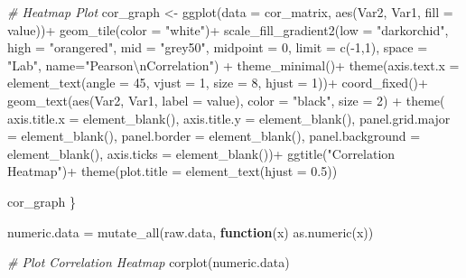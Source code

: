 \documentclass[
]{article}
\newenvironment{Shaded}{\begin{snugshade}}{\end{snugshade}}
\newcommand{\AttributeTok}[1]{\textcolor[rgb]{0.77,0.63,0.00}{#1}}
\newcommand{\CommentTok}[1]{\textcolor[rgb]{0.56,0.35,0.01}{\textit{#1}}}
\newcommand{\ControlFlowTok}[1]{\textcolor[rgb]{0.13,0.29,0.53}{\textbf{#1}}}
\newcommand{\DecValTok}[1]{\textcolor[rgb]{0.00,0.00,0.81}{#1}}
\newcommand{\FloatTok}[1]{\textcolor[rgb]{0.00,0.00,0.81}{#1}}
\newcommand{\FunctionTok}[1]{\textcolor[rgb]{0.00,0.00,0.00}{#1}}
\newcommand{\NormalTok}[1]{#1}
\newcommand{\OtherTok}[1]{\textcolor[rgb]{0.56,0.35,0.01}{#1}}
\newcommand{\SpecialCharTok}[1]{\textcolor[rgb]{0.00,0.00,0.00}{#1}}
\newcommand{\StringTok}[1]{\textcolor[rgb]{0.31,0.60,0.02}{#1}}
\begin{document}
\begin{Shaded}
\begin{Highlighting}[]
  \CommentTok{\# Heatmap Plot}
\NormalTok{  cor\_graph }\OtherTok{\textless{}{-}} \FunctionTok{ggplot}\NormalTok{(}\AttributeTok{data =}\NormalTok{ cor\_matrix, }\FunctionTok{aes}\NormalTok{(Var2, Var1, }\AttributeTok{fill =}\NormalTok{ value))}\SpecialCharTok{+}
    \FunctionTok{geom\_tile}\NormalTok{(}\AttributeTok{color =} \StringTok{"white"}\NormalTok{)}\SpecialCharTok{+}
    \FunctionTok{scale\_fill\_gradient2}\NormalTok{(}\AttributeTok{low =} \StringTok{"darkorchid"}\NormalTok{, }\AttributeTok{high =} \StringTok{"orangered"}\NormalTok{, }\AttributeTok{mid =} \StringTok{"grey50"}\NormalTok{, }
                         \AttributeTok{midpoint =} \DecValTok{0}\NormalTok{, }\AttributeTok{limit =} \FunctionTok{c}\NormalTok{(}\SpecialCharTok{{-}}\DecValTok{1}\NormalTok{,}\DecValTok{1}\NormalTok{), }\AttributeTok{space =} \StringTok{"Lab"}\NormalTok{, }
                         \AttributeTok{name=}\StringTok{"Pearson}\SpecialCharTok{\textbackslash{}n}\StringTok{Correlation"}\NormalTok{) }\SpecialCharTok{+}
    \FunctionTok{theme\_minimal}\NormalTok{()}\SpecialCharTok{+} 
    \FunctionTok{theme}\NormalTok{(}\AttributeTok{axis.text.x =} \FunctionTok{element\_text}\NormalTok{(}\AttributeTok{angle =} \DecValTok{45}\NormalTok{, }\AttributeTok{vjust =} \DecValTok{1}\NormalTok{, }
                                     \AttributeTok{size =} \DecValTok{8}\NormalTok{, }\AttributeTok{hjust =} \DecValTok{1}\NormalTok{))}\SpecialCharTok{+}
    \FunctionTok{coord\_fixed}\NormalTok{()}\SpecialCharTok{+} \FunctionTok{geom\_text}\NormalTok{(}\FunctionTok{aes}\NormalTok{(Var2, Var1, }\AttributeTok{label =}\NormalTok{ value), }\AttributeTok{color =} \StringTok{"black"}\NormalTok{, }\AttributeTok{size =} \DecValTok{2}\NormalTok{) }\SpecialCharTok{+}
    \FunctionTok{theme}\NormalTok{(}
      \AttributeTok{axis.title.x =} \FunctionTok{element\_blank}\NormalTok{(),}
      \AttributeTok{axis.title.y =} \FunctionTok{element\_blank}\NormalTok{(),}
      \AttributeTok{panel.grid.major =} \FunctionTok{element\_blank}\NormalTok{(),}
      \AttributeTok{panel.border =} \FunctionTok{element\_blank}\NormalTok{(),}
      \AttributeTok{panel.background =} \FunctionTok{element\_blank}\NormalTok{(),}
      \AttributeTok{axis.ticks =} \FunctionTok{element\_blank}\NormalTok{())}\SpecialCharTok{+}
      \FunctionTok{ggtitle}\NormalTok{(}\StringTok{"Correlation Heatmap"}\NormalTok{)}\SpecialCharTok{+}
      \FunctionTok{theme}\NormalTok{(}\AttributeTok{plot.title =} \FunctionTok{element\_text}\NormalTok{(}\AttributeTok{hjust =} \FloatTok{0.5}\NormalTok{))}
  
\NormalTok{  cor\_graph}
\NormalTok{\}}

\NormalTok{numeric.data }\OtherTok{=} \FunctionTok{mutate\_all}\NormalTok{(raw.data, }\ControlFlowTok{function}\NormalTok{(x) }\FunctionTok{as.numeric}\NormalTok{(x))}

\CommentTok{\# Plot Correlation Heatmap}
\FunctionTok{corplot}\NormalTok{(numeric.data)}
\end{Highlighting}
\end{Shaded}
\end{document}
